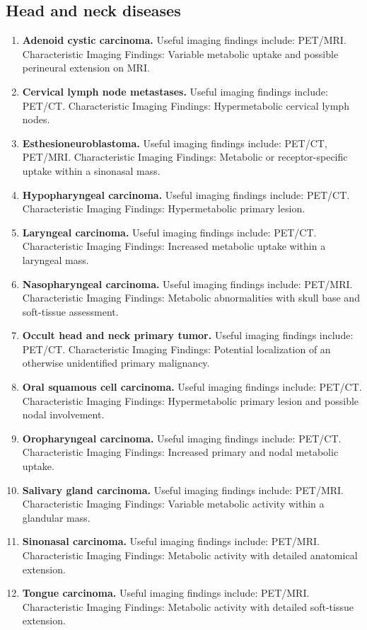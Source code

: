 \subsection{Head and neck diseases}
\begin{enumerate}[leftmargin=*,itemsep=0.45em,topsep=0.4em]
\item \textbf{Adenoid cystic carcinoma.} Useful imaging findings include: PET/MRI. Characteristic Imaging Findings: Variable metabolic uptake and possible perineural extension on MRI.
\item \textbf{Cervical lymph node metastases.} Useful imaging findings include: PET/CT. Characteristic Imaging Findings: Hypermetabolic cervical lymph nodes.
\item \textbf{Esthesioneuroblastoma.} Useful imaging findings include: PET/CT, PET/MRI. Characteristic Imaging Findings: Metabolic or receptor-specific uptake within a sinonasal mass.
\item \textbf{Hypopharyngeal carcinoma.} Useful imaging findings include: PET/CT. Characteristic Imaging Findings: Hypermetabolic primary lesion.
\item \textbf{Laryngeal carcinoma.} Useful imaging findings include: PET/CT. Characteristic Imaging Findings: Increased metabolic uptake within a laryngeal mass.
\item \textbf{Nasopharyngeal carcinoma.} Useful imaging findings include: PET/MRI. Characteristic Imaging Findings: Metabolic abnormalities with skull base and soft-tissue assessment.
\item \textbf{Occult head and neck primary tumor.} Useful imaging findings include: PET/CT. Characteristic Imaging Findings: Potential localization of an otherwise unidentified primary malignancy.
\item \textbf{Oral squamous cell carcinoma.} Useful imaging findings include: PET/CT. Characteristic Imaging Findings: Hypermetabolic primary lesion and possible nodal involvement.
\item \textbf{Oropharyngeal carcinoma.} Useful imaging findings include: PET/CT. Characteristic Imaging Findings: Increased primary and nodal metabolic uptake.
\item \textbf{Salivary gland carcinoma.} Useful imaging findings include: PET/MRI. Characteristic Imaging Findings: Variable metabolic activity within a glandular mass.
\item \textbf{Sinonasal carcinoma.} Useful imaging findings include: PET/MRI. Characteristic Imaging Findings: Metabolic activity with detailed anatomical extension.
\item \textbf{Tongue carcinoma.} Useful imaging findings include: PET/MRI. Characteristic Imaging Findings: Metabolic activity with detailed soft-tissue extension.
\end{enumerate}

